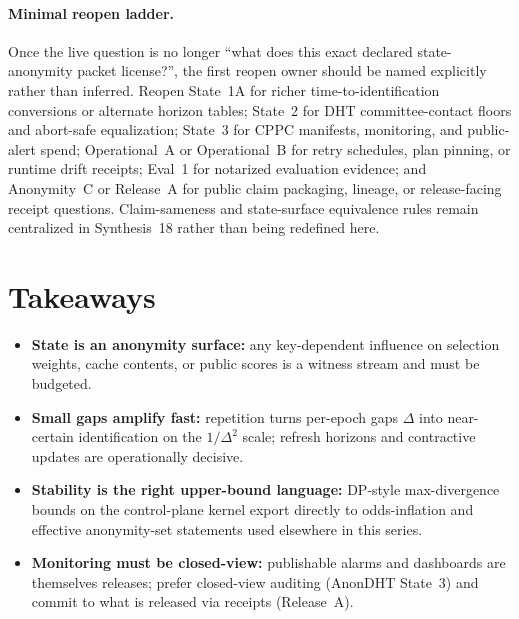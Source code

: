 \documentclass[11pt]{article}
\begin{document}
\paragraph{Minimal reopen ladder.}
Once the live question is no longer ``what does this exact declared state-anonymity packet license?'', the first reopen owner should be named explicitly rather than inferred.
Reopen State~1A for richer time-to-identification conversions or alternate horizon tables; State~2 for DHT committee-contact floors and abort-safe equalization; State~3 for CPPC manifests, monitoring, and public-alert spend; Operational~A or Operational~B for retry schedules, plan pinning, or runtime drift receipts; Eval~1 for notarized evaluation evidence; and Anonymity~C or Release~A for public claim packaging, lineage, or release-facing receipt questions. Claim-sameness and state-surface equivalence rules remain centralized in Synthesis~18 rather than being redefined here.\cite{series:state1addendum,series:state2,series:state3,series:operationalA,series:operationalB,series:evalnotary,series:abomoinl,series:release,series:planstateequiv}

\section{Takeaways}
\begin{itemize}[leftmargin=*]
\item \textbf{State is an anonymity surface:} any key-dependent influence on selection weights, cache contents, or public scores is a witness stream and must be budgeted.
\item \textbf{Small gaps amplify fast:} repetition turns per-epoch gaps $\Delta$ into near-certain identification on the $1/\Delta^2$ scale; refresh horizons and contractive updates are operationally decisive.
\item \textbf{Stability is the right upper-bound language:} DP-style max-divergence bounds on the control-plane kernel export directly to odds-inflation and effective anonymity-set statements used elsewhere in this series.
\item \textbf{Monitoring must be closed-view:} publishable alarms and dashboards are themselves releases; prefer closed-view auditing (AnonDHT State~3) and commit to what is released via receipts (Release~A).
\end{itemize}
\end{document}
